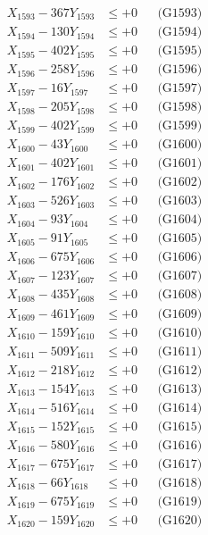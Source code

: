 \documentclass[a4paper,10pt]{article}
\begin{document}
{\begin{align}
X_{1593} - 367Y_{1593} &\leq +0 && \text{(G1593)} \\
X_{1594} - 130Y_{1594} &\leq +0 && \text{(G1594)} \\
X_{1595} - 402Y_{1595} &\leq +0 && \text{(G1595)} \\
X_{1596} - 258Y_{1596} &\leq +0 && \text{(G1596)} \\
X_{1597} - 16Y_{1597} &\leq +0 && \text{(G1597)} \\
X_{1598} - 205Y_{1598} &\leq +0 && \text{(G1598)} \\
X_{1599} - 402Y_{1599} &\leq +0 && \text{(G1599)} \\
X_{1600} - 43Y_{1600} &\leq +0 && \text{(G1600)} \\
\allowbreak
X_{1601} - 402Y_{1601} &\leq +0 && \text{(G1601)} \\
X_{1602} - 176Y_{1602} &\leq +0 && \text{(G1602)} \\
X_{1603} - 526Y_{1603} &\leq +0 && \text{(G1603)} \\
X_{1604} - 93Y_{1604} &\leq +0 && \text{(G1604)} \\
X_{1605} - 91Y_{1605} &\leq +0 && \text{(G1605)} \\
X_{1606} - 675Y_{1606} &\leq +0 && \text{(G1606)} \\
X_{1607} - 123Y_{1607} &\leq +0 && \text{(G1607)} \\
X_{1608} - 435Y_{1608} &\leq +0 && \text{(G1608)} \\
X_{1609} - 461Y_{1609} &\leq +0 && \text{(G1609)} \\
X_{1610} - 159Y_{1610} &\leq +0 && \text{(G1610)} \\
\allowbreak
X_{1611} - 509Y_{1611} &\leq +0 && \text{(G1611)} \\
X_{1612} - 218Y_{1612} &\leq +0 && \text{(G1612)} \\
X_{1613} - 154Y_{1613} &\leq +0 && \text{(G1613)} \\
X_{1614} - 516Y_{1614} &\leq +0 && \text{(G1614)} \\
X_{1615} - 152Y_{1615} &\leq +0 && \text{(G1615)} \\
X_{1616} - 580Y_{1616} &\leq +0 && \text{(G1616)} \\
X_{1617} - 675Y_{1617} &\leq +0 && \text{(G1617)} \\
X_{1618} - 66Y_{1618} &\leq +0 && \text{(G1618)} \\
X_{1619} - 675Y_{1619} &\leq +0 && \text{(G1619)} \\
X_{1620} - 159Y_{1620} &\leq +0 && \text{(G1620)} \\

\end{align}}
\end{document}
